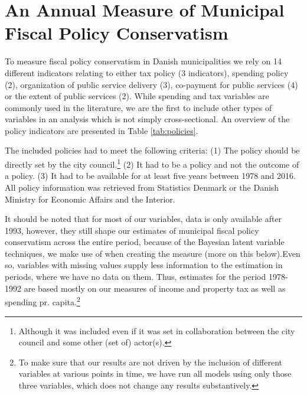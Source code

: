 \documentclass[a4paper,12pt]{article}
\begin{document}
\section{An Annual Measure of Municipal Fiscal Policy Conservatism}
To measure fiscal policy conservatism in Danish municipalities we rely on 14 different indicators relating to either tax policy (3 indicators), spending policy (2), organization of public service delivery (3), co-payment for public services (4) or the extent of public services (2). While  spending and tax variables are commonly used in the literature, we are the first to include other types of variables in an analysis which is not simply cross-sectional. An overview of the policy indicators are presented in Table \ref{tab:policies}.

The included policies had to meet the following criteria: (1) The policy should be directly set by the city council.\footnote{Although it was included even if it was set in collaboration between the city council and some other  (set of) actor(s).} (2) It had to be a policy and not the outcome of a policy. (3) It had to be available for at least five years between 1978 and 2016. All policy information was retrieved from Statistics Denmark or the Danish Ministry for Economic Affairs and the Interior.



It should be noted that for most of our variables, data is only available after 1993, however, they still shape our estimates of municipal fiscal policy conservatism across the entire period, because of the Bayesian latent variable techniques, we make use of when creating the measure (more on this below).Even so, variables with missing values supply less information to the estimation in periods, where we have no data on them. Thus, estimates for the period 1978-1992 are based mostly on our measures of income and property tax as well as spending pr. capita.\footnote{To make sure that our results are not driven by the inclusion of different variables at various points in time, we have run all models using only those three variables, which does not change any results substantively.}

\end{document}
